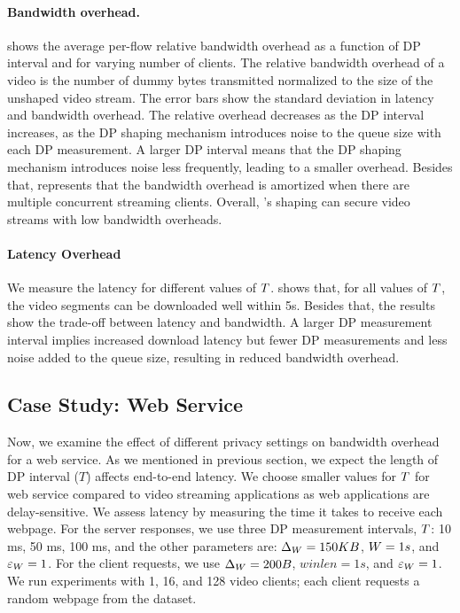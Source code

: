 \paragraph{Bandwidth overhead.}
 shows the average per-flow relative bandwidth overhead as a function of DP interval and for varying number of clients.
The relative bandwidth overhead of a video is the number of dummy bytes transmitted normalized to the size of the unshaped video stream.
The error bars show the standard deviation in latency and bandwidth overhead.
The relative overhead decreases as the DP interval increases, as the DP shaping mechanism introduces noise to the queue size with each DP measurement.
A larger DP interval means that the DP shaping mechanism introduces noise less frequently, leading to a smaller overhead. 
Besides that,  represents that the bandwidth overhead is amortized when there are multiple concurrent streaming clients.
Overall, {\sys}'s shaping can secure video streams with low bandwidth overheads.

\paragraph{Latency Overhead}
We measure the latency for different values of $T$.
 shows that, for all values of $T$, the video segments can be downloaded well within 5s. 
Besides that, the results show the trade-off between latency and bandwidth.
A larger DP measurement interval implies increased download latency but fewer DP measurements and less noise added to the queue size, resulting in reduced bandwidth overhead.







\subsection{Case Study: Web Service}\label{subsec:eval-bw-web}
Now, we examine the effect of different privacy settings on bandwidth overhead for a web service.
As we mentioned in previous section, we expect the length of DP interval ($T$) affects end-to-end latency.
We choose smaller values for $T$ for web service compared to video streaming applications as web applications are delay-sensitive.
We assess latency by measuring the time it takes to receive each webpage.
For the server responses, we use three DP measurement intervals, $T$: 10 ms, 50 ms, 100 ms, and the other parameters are: $\Delta_{W} = 150 KB$, $W = 1s$, and
$\varepsilon_{W} = 1$.
For the client requests, we use $\Delta_{W} = 200 B$, $winlen = 1s$, and $\varepsilon_{W} = 1$.
We run experiments with 1, 16, and 128 video clients; each client requests a random webpage from the dataset.



